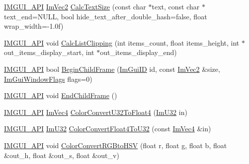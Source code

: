 \begin{DoxyCompactItemize}
\item 
\mbox{\hyperlink{imgui_8h_a43829975e84e45d1149597467a14bbf5}{I\+M\+G\+U\+I\+\_\+\+A\+PI}} \mbox{\hyperlink{struct_im_vec2}{Im\+Vec2}} \mbox{\hyperlink{namespace_im_gui_a848b9db6cc4a186751c0ecebcaadc33b}{Calc\+Text\+Size}} (const char $\ast$text, const char $\ast$text\+\_\+end=N\+U\+LL, bool hide\+\_\+text\+\_\+after\+\_\+double\+\_\+hash=false, float wrap\+\_\+width=-\/1.\+0f)
\item 
\mbox{\hyperlink{imgui_8h_a43829975e84e45d1149597467a14bbf5}{I\+M\+G\+U\+I\+\_\+\+A\+PI}} void \mbox{\hyperlink{namespace_im_gui_ae5319370628374ef8febf0c25c285b7e}{Calc\+List\+Clipping}} (int items\+\_\+count, float items\+\_\+height, int $\ast$out\+\_\+items\+\_\+display\+\_\+start, int $\ast$out\+\_\+items\+\_\+display\+\_\+end)
\item 
\mbox{\hyperlink{imgui_8h_a43829975e84e45d1149597467a14bbf5}{I\+M\+G\+U\+I\+\_\+\+A\+PI}} bool \mbox{\hyperlink{namespace_im_gui_a0565e1ef69c897b1f30f37f95dd787f1}{Begin\+Child\+Frame}} (\mbox{\hyperlink{imgui_8h_a1785c9b6f4e16406764a85f32582236f}{Im\+Gui\+ID}} id, const \mbox{\hyperlink{struct_im_vec2}{Im\+Vec2}} \&size, \mbox{\hyperlink{imgui_8h_a0b8e067ab4f7a818828c8d89e531addc}{Im\+Gui\+Window\+Flags}} flags=0)
\item 
\mbox{\hyperlink{imgui_8h_a43829975e84e45d1149597467a14bbf5}{I\+M\+G\+U\+I\+\_\+\+A\+PI}} void \mbox{\hyperlink{namespace_im_gui_ac4bd9024554b5074805bc0ce3076c514}{End\+Child\+Frame}} ()
\item 
\mbox{\hyperlink{imgui_8h_a43829975e84e45d1149597467a14bbf5}{I\+M\+G\+U\+I\+\_\+\+A\+PI}} \mbox{\hyperlink{struct_im_vec4}{Im\+Vec4}} \mbox{\hyperlink{namespace_im_gui_a74df648cad381b5ad979c3609b7f4b2a}{Color\+Convert\+U32\+To\+Float4}} (\mbox{\hyperlink{imgui_8h_a118cff4eeb8d00e7d07ce3d6460eed36}{Im\+U32}} in)
\item 
\mbox{\hyperlink{imgui_8h_a43829975e84e45d1149597467a14bbf5}{I\+M\+G\+U\+I\+\_\+\+A\+PI}} \mbox{\hyperlink{imgui_8h_a118cff4eeb8d00e7d07ce3d6460eed36}{Im\+U32}} \mbox{\hyperlink{namespace_im_gui_abe2691de0b1a71c774ab24cc91564a94}{Color\+Convert\+Float4\+To\+U32}} (const \mbox{\hyperlink{struct_im_vec4}{Im\+Vec4}} \&in)
\item 
\mbox{\hyperlink{imgui_8h_a43829975e84e45d1149597467a14bbf5}{I\+M\+G\+U\+I\+\_\+\+A\+PI}} void \mbox{\hyperlink{namespace_im_gui_aaed5ed34aaaa02b61cbb67598c0ad9ca}{Color\+Convert\+R\+G\+Bto\+H\+SV}} (float r, float g, float b, float \&out\+\_\+h, float \&out\+\_\+s, float \&out\+\_\+v)
\item 

\end{DoxyCompactItemize}
